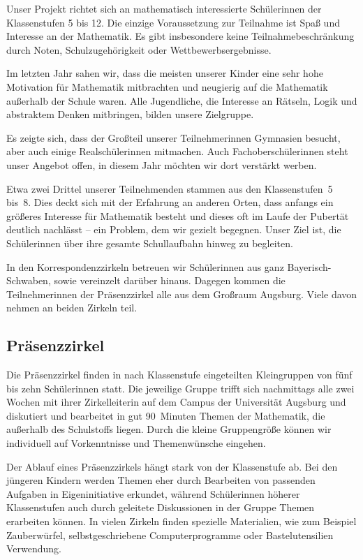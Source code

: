 \documentclass[12pt]{zettel}
\begin{document}
Unser Projekt richtet sich an mathematisch interessierte Schülerinnen
der Klassenstufen 5 bis 12. Die einzige Voraussetzung zur
Teilnahme ist Spaß und Interesse an der Mathematik. Es gibt insbesondere
keine Teilnahmebeschränkung durch Noten, Schulzugehörigkeit oder
Wettbewerbsergebnisse.

Im letzten Jahr sahen wir, dass die meisten unserer Kinder eine
sehr hohe Motivation für Mathematik mitbrachten und neugierig auf die
Mathematik außerhalb der Schule waren. Alle Jugendliche, die Interesse an
Rätseln, Logik und abstraktem Denken mitbringen, bilden unsere
Zielgruppe.

Es zeigte sich, dass der Großteil unserer Teilnehmerinnen Gymnasien besucht, aber auch einige Realschülerinnen mitmachen.
Auch Fachoberschülerinnen steht unser Angebot offen, in diesem Jahr möchten wir dort verstärkt werben.

Etwa zwei Drittel unserer Teilnehmenden
stammen aus den Klassenstufen~5 bis~8.
Dies deckt sich mit der
Erfahrung an anderen Orten, dass anfangs ein größeres Interesse für
Mathematik besteht und dieses oft im Laufe der Pubertät
deutlich nachlässt -- ein Problem, dem wir gezielt begegnen. Unser Ziel ist, die Schülerinnen über ihre gesamte Schullaufbahn hinweg zu begleiten.

In den Korrespondenzzirkeln betreuen wir Schülerinnen aus ganz Bayerisch-Schwaben, sowie vereinzelt darüber hinaus. Dagegen kommen die Teilnehmerinnen
der Prä\-senz\-zir\-kel alle aus dem Großraum Augsburg. Viele davon
nehmen an beiden Zirkeln teil.

\subsection{Präsenzzirkel}

Die Präsenzzirkel finden in nach Klassenstufe eingeteilten
Kleingruppen von fünf bis zehn Schülerinnen statt.
Die jeweilige Gruppe trifft sich nachmittags alle zwei Wochen mit ihrer Zirkelleiterin auf dem Campus der Universität Augsburg und diskutiert und
bearbeitet in gut 90~Minuten Themen der Mathematik, die außerhalb des
Schulstoffs liegen. Durch die kleine Gruppengröße können wir individuell auf
Vorkenntnisse und Themenwünsche eingehen.

Der Ablauf eines Präsenzzirkels hängt stark von der Klassenstufe ab. Bei den
jüngeren Kindern werden Themen eher durch Bearbeiten von passenden
Aufgaben in Eigeninitiative erkundet, während Schülerinnen höherer
Klassenstufen auch durch geleitete Diskussionen in der Gruppe
Themen erarbeiten können. In vielen Zirkeln finden spezielle Materialien,
wie zum Beispiel Zauberwürfel, selbstgeschriebene Computerprogramme oder
Bastelutensilien Verwendung.
\end{document}
